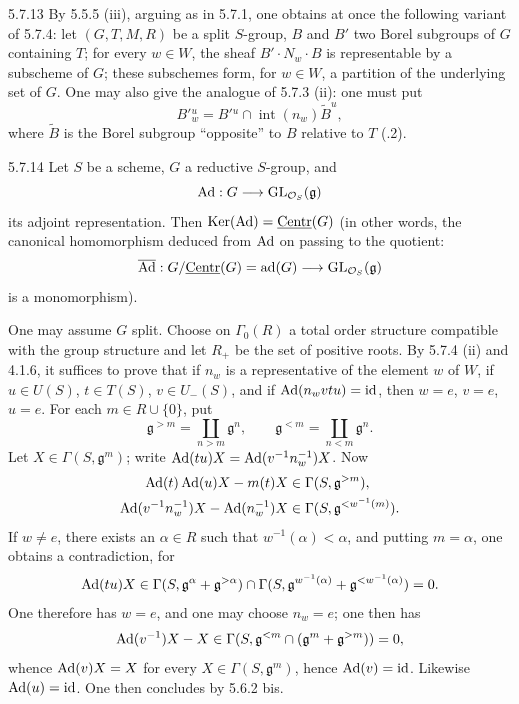 \begin{remark}{5.7.13}\label{XXII.5.7.13}
By 5.5.5 (iii), arguing as in 5.7.1, one obtains at once the following variant of 5.7.4: let $(G,T,M,R)$ be a split $S$-group, $B$ and $B'$ two Borel subgroups of $G$ containing $T$; for every $w\in W$, the sheaf $B'\cdot N_w\cdot B$ is representable by a subscheme of $G$; these subschemes form, for $w\in W$, a partition of the underlying set of $G$. One may also give the analogue of 5.7.3 (ii): one must put
\[
B'{}^u_w=B'{}^u\cap\operatorname{int}(n_w)\widetilde B^u,
\]
where $\widetilde B$ is the Borel subgroup ``opposite'' to $B$ relative to $T$ (.2).
\end{remark}
\begin{proposition}{5.7.14}\label{XXII.5.7.14}
Let $S$ be a scheme, $G$ a reductive $S$-group, and
\[
\operatorname{Ad}:G\longrightarrow\operatorname{GL}_{\mathcal{O}_S}(\mathfrak g)
\]
its adjoint representation. Then $\operatorname{Ker}(\operatorname{Ad})=\underline{\mathrm{Centr}}(G)$ (in other words, the canonical homomorphism deduced from $\operatorname{Ad}$ on passing to the quotient:
\[
\overline{\operatorname{Ad}}:G/\underline{\mathrm{Centr}}(G)=\operatorname{ad}(G)\longrightarrow\operatorname{GL}_{\mathcal{O}_S}(\mathfrak g)
\]
is a monomorphism).{\renewcommand{\thefootnote}{(48)}}
\end{proposition}
One may assume $G$ split. Choose on $\Gamma_0(R)$ a total order structure compatible with the group structure and let $R_+$ be the set of positive roots. By 5.7.4 (ii) and 4.1.6, it suffices to prove that if $n_w$ is a representative of the element $w$ of $W$, if $u\in U(S)$, $t\in T(S)$, $v\in U_-(S)$, and if $\operatorname{Ad}(n_wvtu)=\mathrm{id}$, then $w=e$, $v=e$, $u=e$. For each $m\in R\cup\{0\}$, put
\[
\mathfrak g^{>m}=\coprod_{n>m}\mathfrak g^n,\qquad\mathfrak g^{<m}=\coprod_{n<m}\mathfrak g^n.
\]
Let $X\in\Gamma(S,\mathfrak g^m)$; write $\operatorname{Ad}(tu)X=\operatorname{Ad}(v^{-1}n_w^{-1})X$. Now
\[
\begin{aligned}
\operatorname{Ad}(t)\operatorname{Ad}(u)X-m(t)X&\in\Gamma(S,\mathfrak g^{>m}),\\
\operatorname{Ad}(v^{-1}n_w^{-1})X-\operatorname{Ad}(n_w^{-1})X&\in\Gamma(S,\mathfrak g^{<w^{-1}(m)}).
\end{aligned}
\]
If $w\ne e$, there exists an $\alpha\in R$ such that $w^{-1}(\alpha)<\alpha$, and putting $m=\alpha$, one obtains a contradiction, for
\[
\begin{gathered}
\operatorname{Ad}(tu)X\in\Gamma(S,\mathfrak g^\alpha+\mathfrak g^{>\alpha})\cap
\Gamma(S,\mathfrak g^{w^{-1}(\alpha)}+\mathfrak g^{<w^{-1}(\alpha)})=0.
\end{gathered}
\]
One therefore has $w=e$, and one may choose $n_w=e$; one then has
\[
\operatorname{Ad}(v^{-1})X-X\in\Gamma(S,\mathfrak g^{<m}\cap(\mathfrak g^m+\mathfrak g^{>m}))=0,
\]
whence $\operatorname{Ad}(v)X=X$ for every $X\in\Gamma(S,\mathfrak g^m)$, hence $\operatorname{Ad}(v)=\mathrm{id}$. Likewise $\operatorname{Ad}(u)=\mathrm{id}$. One then concludes by 5.6.2 bis.

